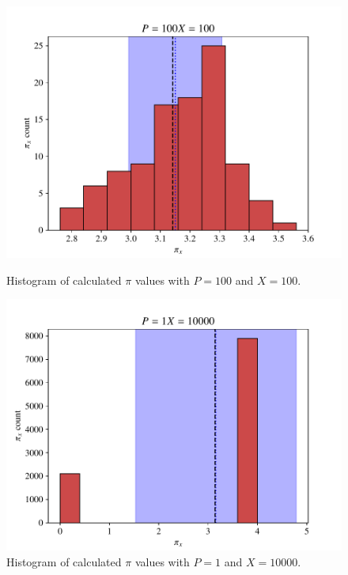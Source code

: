 \begin{figure}[h!]
	\centering
	\begin{minipage}{0.45\linewidth}
		\centering
		\includegraphics[width=\linewidth]{figs/ex1.2_pi_hist_100_100.pdf}
		\caption{Histogram of calculated $\pi$ values with $P = 100$ and
			$X = 100$.}
		\label{fig:pi_hist_100_100}
	\end{minipage}
    \hfill
    \begin{minipage}{.45\linewidth}
       \centering
       \includegraphics[width=\linewidth]{figs/ex1.2_pi_hist_1_10000.pdf} 
		\caption{Histogram of calculated $\pi$ values with $P = 1$ and
			$X = \num{10000}$.}
		\label{fig:pi_hist_1_10000}
    \end{minipage}
\end{figure}








